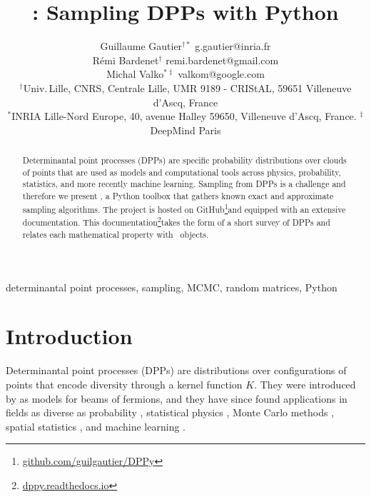 \documentclass[twoside,11pt]{article}
\begin{document}
\title{\DPPy: Sampling DPPs with Python}

\author{\name Guillaume Gautier$^{\dagger*}$ \email g.gautier@inria.fr \\
       \name R\'emi Bardenet$^\dagger$ \email remi.bardenet@gmail.com \\
       \name Michal Valko$^{*\ddag}$ \email valkom@google.com\\
       \addr $^\dagger$Univ.\,Lille, CNRS, Centrale Lille, UMR 9189 - CRIStAL, 59651 Villeneuve d'Ascq, France\\
       \addr $^*$INRIA Lille-Nord Europe, 40, avenue Halley 59650, Villeneuve d'Ascq, France. \addr $^\ddag$DeepMind Paris
}

\editor{}

\maketitle

\setcounter{footnote}{3}
\begin{abstract}%
    Determinantal point processes (DPPs) are specific probability distributions over clouds of points that are used as models and computational tools across physics, probability, statistics, and more recently machine learning.
    Sampling from DPPs is a challenge and therefore we present \DPPy, a Python toolbox that gathers known exact and approximate sampling algorithms.
    The project is hosted on GitHub\!\footnote{\label{fn:github}\href{https://github.com/guilgautier/DPPy}{\textsf{github.com/guilgautier/DPPy}}}and equipped with an extensive documentation.
    This documentation\!\footnote{\label{fn:docs}\href{https://dppy.readthedocs.io}{\textsf{dppy.readthedocs.io}}}takes the form of a short survey of DPPs and relates each mathematical property with \DPPy\ objects.
\end{abstract}

\begin{keywords}%
    determinantal point processes,
    sampling,
    MCMC,
    random matrices,
    Python
\end{keywords}

\section{Introduction} %
\label{sec:introduction}

    Determinantal point processes (DPPs) are distributions over configurations of points that encode diversity through a kernel function $K$.
    They were introduced by \citet{Mac75} as models for beams of fermions, and they have since found applications in fields as diverse as probability \citep{Sos00, Kon05, HKPV06}, statistical physics \citep{PaBe11}, Monte Carlo methods \citep{BaHa16}, spatial statistics \citep{LaMoRu15}, and machine learning \citep[ML,][]{KuTa12}.
\end{document}
